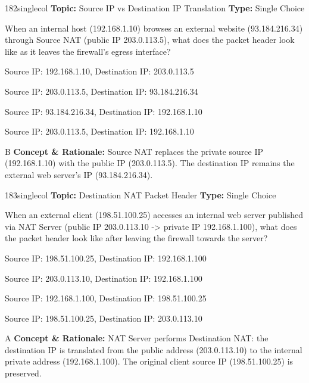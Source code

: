 \begin{qcard}{182}{singlecol}
\textcolor{darkslate!75}{\small\textbf{Topic:} Source IP vs Destination IP Translation \hfill \textbf{Type:} Single Choice}\vspace{0.4em}\par
When an internal host (192.168.1.10) browses an external website (93.184.216.34) through Source NAT (public IP 203.0.113.5), what does the packet header look like as it leaves the firewall's egress interface?
\begin{qoptions}
\item Source IP: 192.168.1.10, Destination IP: 203.0.113.5
\item Source IP: 203.0.113.5, Destination IP: 93.184.216.34
\item Source IP: 93.184.216.34, Destination IP: 192.168.1.10
\item Source IP: 203.0.113.5, Destination IP: 192.168.1.10
\end{qoptions}
\end{qcard}
\nopagebreak
\begin{explainbox}{B}
\textbf{Concept \& Rationale:} Source NAT replaces the private source IP (192.168.1.10) with the public IP (203.0.113.5). The destination IP remains the external web server's IP (93.184.216.34).
\end{explainbox}

\begin{qcard}{183}{singlecol}
\textcolor{darkslate!75}{\small\textbf{Topic:} Destination NAT Packet Header \hfill \textbf{Type:} Single Choice}\vspace{0.4em}\par
When an external client (198.51.100.25) accesses an internal web server published via NAT Server (public IP 203.0.113.10 -\textgreater{} private IP 192.168.1.100), what does the packet header look like after leaving the firewall towards the server?
\begin{qoptions}
\item Source IP: 198.51.100.25, Destination IP: 192.168.1.100
\item Source IP: 203.0.113.10, Destination IP: 192.168.1.100
\item Source IP: 192.168.1.100, Destination IP: 198.51.100.25
\item Source IP: 198.51.100.25, Destination IP: 203.0.113.10
\end{qoptions}
\end{qcard}
\nopagebreak
\begin{explainbox}{A}
\textbf{Concept \& Rationale:} NAT Server performs Destination NAT: the destination IP is translated from the public address (203.0.113.10) to the internal private address (192.168.1.100). The original client source IP (198.51.100.25) is preserved.
\end{explainbox}

